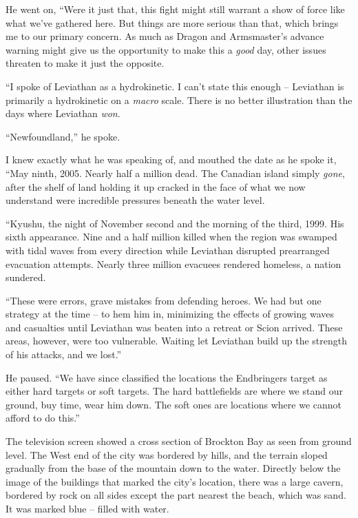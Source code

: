 He went on, ``Were it just that, this fight might still warrant a show of force like what we've gathered here.  But things are more serious than that, which brings me to our primary concern.  As much as Dragon and Armsmaster's advance warning might give us the opportunity to make this a \emph{good} day, other issues threaten to make it just the opposite.



``I spoke of Leviathan as a hydrokinetic.  I can't state this enough – Leviathan is primarily a hydrokinetic on a \emph{macro} scale.  There is no better illustration than the days where Leviathan \emph{won}.



``Newfoundland,'' he spoke.



I knew exactly what he was speaking of, and mouthed the date as he spoke it, ``May ninth, 2005.  Nearly half a million dead.  The Canadian island simply \emph{gone}, after the shelf of land holding it up cracked in the face of what we now understand were incredible pressures beneath the water level.



``Kyushu, the night of November second and the morning of the third, 1999.  His sixth appearance.  Nine and a half million killed when the region was swamped with tidal waves from every direction while Leviathan disrupted prearranged evacuation attempts.  Nearly three million evacuees rendered homeless, a nation sundered.



``These were errors, grave mistakes from defending heroes.  We had but one strategy at the time – to hem him in, minimizing the effects of growing waves and casualties until Leviathan was beaten into a retreat or Scion arrived.  These areas, however, were too vulnerable.  Waiting let Leviathan build up the strength of his attacks, and we lost.''



He paused.  ``We have since classified the locations the Endbringers target as either hard targets or soft targets.  The hard battlefields are where we stand our ground, buy time, wear him down.  The soft ones are locations where we cannot afford to do this.''



The television screen showed a cross section of Brockton Bay as seen from ground level.  The West end of the city was bordered by hills, and the terrain sloped gradually from the base of the mountain down to the water.  Directly below the image of the buildings that marked the city's location, there was a large cavern, bordered by rock on all sides except the part nearest the beach, which was sand.  It was marked blue – filled with water.



